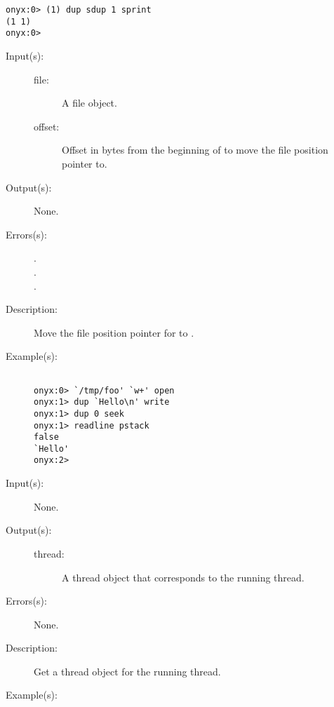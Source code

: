 \begin{description}
\begin{description}
\begin{verbatim}
onyx:0> (1) dup sdup 1 sprint
(1 1)
onyx:0>
		\end{verbatim}
	\end{description}
\label{systemdict:seek}
\item[{\onyxop{file offset}{seek}{--}}: ]
	\begin{description}\item[]
	\item[Input(s): ]
		\begin{description}\item[]
		\item[file: ]
			A file object.
		\item[offset: ]
			Offset in bytes from the beginning of 
			to move the file position pointer to.
		\end{description}
	\item[Output(s): ] None.
	\item[Errors(s): ]
		\begin{description}\item[]
		\item[.]
		\item[.]
		\item[.]
		\end{description}
	\item[Description: ]
		Move the file position pointer for  to
		.
	\item[Example(s): ]\begin{verbatim}

onyx:0> `/tmp/foo' `w+' open
onyx:1> dup `Hello\n' write
onyx:1> dup 0 seek
onyx:1> readline pstack
false
`Hello'
onyx:2>
		\end{verbatim}
	\end{description}
\label{systemdict:self}
\item[{\onyxop{--}{self}{thread}}: ]
	\begin{description}\item[]
	\item[Input(s): ] None.
	\item[Output(s): ]
		\begin{description}\item[]
		\item[thread: ]
			A thread object that corresponds to the running thread.
		\end{description}
	\item[Errors(s): ] None.
	\item[Description: ]
		Get a thread object for the running thread.
	\item[Example(s): ]\begin{verbatim}


\end{verbatim}
\end{description}
\end{description}
